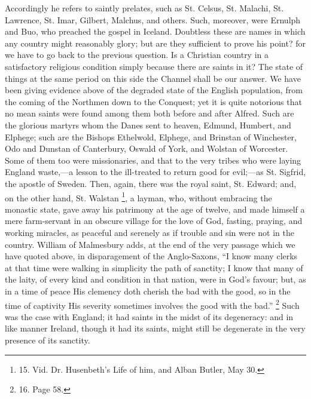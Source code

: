 Accordingly he refers to
saintly prelates, such as St. Celsus, St. Malachi, St. Lawrence, St.
Imar, Gilbert, Malchus, and others. Such, moreover, were Ernulph and
Buo, who preached the gospel in Iceland. Doubtless these are names in
which any country might reasonably glory; but are they sufficient to
prove his point? for we have to go back to the previous question. Is a
Christian country in a satisfactory religious condition simply because
there are saints in it? The state of things at the same period on this
side the Channel shall be our answer. We have been giving evidence
above of the degraded state of the English population, from the coming
of the Northmen down to the Conquest; yet it is quite notorious that
no mean saints were found among them both before and after Alfred.
Such are the glorious martyrs whom the Danes sent to heaven, Edmund,
Humbert, and Elphege; such are the Bishops Ethelwold, Elphege, and
Brinstan of Winchester, Odo and Dunstan of Canterbury, Oswald of York,
and Wolstan of Worcester. Some of them too were missionaries, and that
to the very tribes who were laying England waste,—a lesson to the
ill-treated to return good for evil;—as St. Sigfrid, the apostle of
Sweden. Then, again, there was the royal saint, St. Edward; and, on
the other hand, St. Walstan \footnote{15.
Vid. Dr. Husenbeth's Life of him, and Alban Butler, May 30.},
a layman, who, without embracing the monastic state, gave away his
patrimony at the age of twelve, and made himself a mere farm-servant
in an obscure village for the love of God, fasting, praying, and
working miracles, as peaceful and serenely as if trouble and sin
were not in the country. William of Malmesbury adds, at the end of the
very passage which we have quoted above, in disparagement of the
Anglo-Saxons, ``I know many clerks at that time were walking in
simplicity the path of sanctity; I know that many of the laity, of
every kind and condition in that nation, were in God's favour; but, as
in a time of peace His clemency doth cherish the bad with the good, so
in the time of captivity His severity sometimes involves the good with
the bad.'' \footnote{16.
Page 58.} Such was the
case with England; it had saints in the midst of its degeneracy: and in
like manner Ireland, though it had its saints, might still be
degenerate in the very presence of its sanctity.

